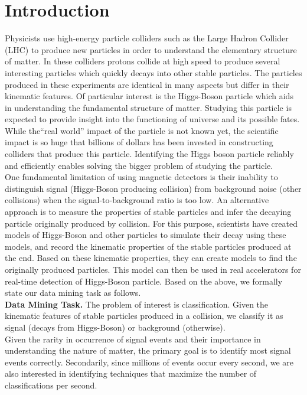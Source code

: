 \section{Introduction}
\label{sec:introduction}

Physicists use high-energy particle colliders such as the Large Hadron Collider (LHC) to produce new particles in order to understand the elementary structure of matter. In these colliders protons collide at high speed to produce several interesting particles which quickly decays into other stable particles. The particles produced in these experiments are identical in many aspects but differ in their kinematic features. Of particular interest is the Higgs-Boson particle which aids in understanding the fundamental structure of matter. Studying this particle is expected to provide insight into the functioning of universe and its possible fates. While the``real world'' impact of the particle is not known yet, the scientific impact is so huge that billions of dollars has been invested in constructing colliders that produce this particle. Identifying the Higgs boson particle reliably and efficiently enables solving the bigger problem of studying the particle. \\

One fundamental limitation of using magnetic detectors is their inability to distinguish signal (Higgs-Boson producing collision) from background noise (other collisions) when the signal-to-background ratio is too low. An alternative approach is to measure the properties of stable particles and infer the decaying particle originally produced by collision. For this purpose, scientists have created models of Higgs-Boson and other particles to simulate their decay using these models, and record the kinematic properties of the stable particles produced at the end. Based on these kinematic properties, they can create models to find the originally produced particles. This model can then be used in real accelerators for real-time detection of Higgs-Boson particle. Based on the above, we formally state our data mining task as follows.\\

\textbf{Data Mining Task.} The problem of interest is classification. Given the kinematic features of stable particles produced in a collision, we classify it as signal (decays from Higgs-Boson) or background (otherwise).\\

Given the rarity in occurrence of signal events and their importance in understanding the nature of matter, the primary goal is to identify most signal events correctly. Secondarily, since millions of events occur every second, we are also interested in identifying techniques that maximize the number of classifications per second. \\

